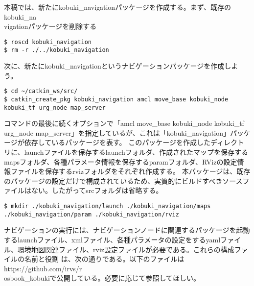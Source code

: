 本稿では、新たにkobuki\_navigationパッケージを作成する。まず、既存のkobuki\_na\\vigationパッケージを削除する

\begin{lstlisting}[language=ROS]
$ roscd kobuki_navigation
$ rm -r ./../kobuki_navigation
\end{lstlisting}

次に、新たにkobuki\_navigationというナビゲーションパッケージを作成しよう。

\begin{lstlisting}[language=ROS]
$ cd ~/catkin_ws/src/
$ catkin_create_pkg kobuki_navigation amcl move_base kobuki_node kobuki_tf urg_node map_server
\end{lstlisting}

コマンドの最後に続くオプションで「amcl move\_base kobuki\_node kobuki\_tf urg\_node map\_server」を指定しているが、これは「kobuki\_navigation」パッケージが依存しているパッケージを表す。
このパッケージを作成したディレクトリに、launchファイルを保存するlaunchフォルダ、作成されたマップを保存するmapsフォルダ、各種パラメータ情報を保存するparamフォルダ、RVizの設定情報ファイルを保存するrvizフォルダをそれぞれ作成する。  本パッケージは、既存のパッケージの設定だけで構成されているため、実質的にビルドすべきソースファイルはない。したがってsrcフォルダは省略する。

\begin{lstlisting}[language=ROS]
$ mkdir ./kobuki_navigation/launch ./kobuki_navigation/maps ./kobuki_navigation/param ./kobuki_navigation/rviz
\end{lstlisting}

ナビゲーションの実行には、ナビゲーションノードに関連するパッケージを起動するlaunchファイル、xmlファイル、各種パラメータの設定をするyamlファイル、環境地図関連ファイル、rviz設定ファイルが必要である。これらの構成ファイルの名前と役割 は、次の通りである。以下のファイルはhttps://github.com/irvs/r\\osbook\_kobukiで公開している。必要に応じて参照してほしい。\\

